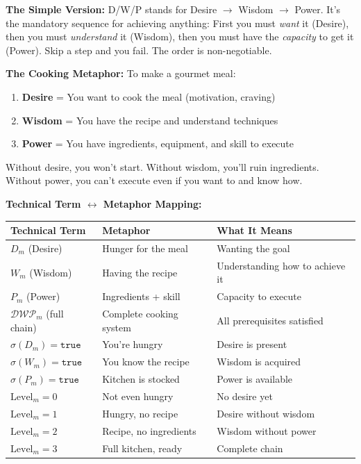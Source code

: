 \documentclass[11pt,twoside]{book}
\newcommand{\DWP}{\mathcal{DWP}}
\begin{document}
\begin{tcolorbox}[colback=green!5!white,colframe=green!65!black,title=\textbf{Plain English: What is a D/W/P Chain?},breakable]

\textbf{The Simple Version:}
D/W/P stands for Desire $\to$ Wisdom $\to$ Power. It's the mandatory sequence for achieving anything: First you must \textit{want} it (Desire), then you must \textit{understand} it (Wisdom), then you must have the \textit{capacity} to get it (Power). Skip a step and you fail. The order is non-negotiable.

\textbf{The Cooking Metaphor:}
To make a gourmet meal:
\begin{enumerate}
    \item \textbf{Desire} = You want to cook the meal (motivation, craving)
    \item \textbf{Wisdom} = You have the recipe and understand techniques
    \item \textbf{Power} = You have ingredients, equipment, and skill to execute
\end{enumerate}

Without desire, you won't start. Without wisdom, you'll ruin ingredients. Without power, you can't execute even if you want to and know how.

\textbf{Technical Term $\leftrightarrow$ Metaphor Mapping:}
\begin{center}
\footnotesize
\begin{tabularx}{\textwidth}{>{\raggedright\arraybackslash}X|>{\raggedright\arraybackslash}X|>{\raggedright\arraybackslash}X}
\toprule
\textbf{Technical Term} & \textbf{Metaphor} & \textbf{What It Means} \\
\midrule
$D_m$ (Desire) & Hunger for the meal & Wanting the goal \\
$W_m$ (Wisdom) & Having the recipe & Understanding how to achieve it \\
$P_m$ (Power) & Ingredients + skill & Capacity to execute \\
$\DWP_m$ (full chain) & Complete cooking system & All prerequisites satisfied \\
$\sigma(D_m) = \mathtt{true}$ & You're hungry & Desire is present \\
$\sigma(W_m) = \mathtt{true}$ & You know the recipe & Wisdom is acquired \\
$\sigma(P_m) = \mathtt{true}$ & Kitchen is stocked & Power is available \\
$\mathrm{Level}_m = 0$ & Not even hungry & No desire yet \\
$\mathrm{Level}_m = 1$ & Hungry, no recipe & Desire without wisdom \\
$\mathrm{Level}_m = 2$ & Recipe, no ingredients & Wisdom without power \\
$\mathrm{Level}_m = 3$ & Full kitchen, ready & Complete chain \\
\bottomrule
\end{tabularx}
\end{center}


\end{tcolorbox}
\end{document}

